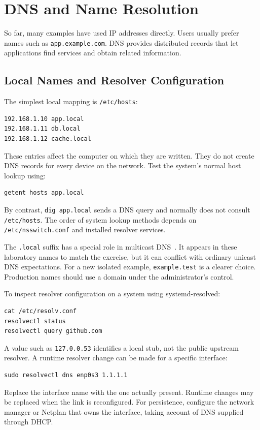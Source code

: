 \documentclass[journal]{IEEEtran}
\begin{document}
\section{DNS and Name Resolution}
So far, many examples have used IP addresses directly. Users usually prefer names such as \texttt{app.example.com}. DNS provides distributed records that let applications find services and obtain related information.

\subsection{Local Names and Resolver Configuration}
The simplest local mapping is \texttt{/etc/hosts}:
\begin{lstlisting}
192.168.1.10 app.local
192.168.1.11 db.local
192.168.1.12 cache.local
\end{lstlisting}
These entries affect the computer on which they are written. They do not create DNS records for every device on the network. Test the system's normal host lookup using:
\begin{lstlisting}
getent hosts app.local
\end{lstlisting}
By contrast, \texttt{dig app.local} sends a DNS query and normally does not consult \texttt{/etc/hosts}. The order of system lookup methods depends on \texttt{/etc/nsswitch.conf} and installed resolver services.

The \texttt{.local} suffix has a special role in multicast DNS~\cite{mdns}. It appears in these laboratory names to match the exercise, but it can conflict with ordinary unicast DNS expectations. For a new isolated example, \texttt{example.test} is a clearer choice. Production names should use a domain under the administrator's control.

To inspect resolver configuration on a system using systemd-resolved:
\begin{lstlisting}
cat /etc/resolv.conf
resolvectl status
resolvectl query github.com
\end{lstlisting}
A value such as \texttt{127.0.0.53} identifies a local stub, not the public upstream resolver. A runtime resolver change can be made for a specific interface:
\begin{lstlisting}
sudo resolvectl dns enp0s3 1.1.1.1
\end{lstlisting}
Replace the interface name with the one actually present. Runtime changes may be replaced when the link is reconfigured. For persistence, configure the network manager or Netplan that owns the interface, taking account of DNS supplied through DHCP.
\end{document}
